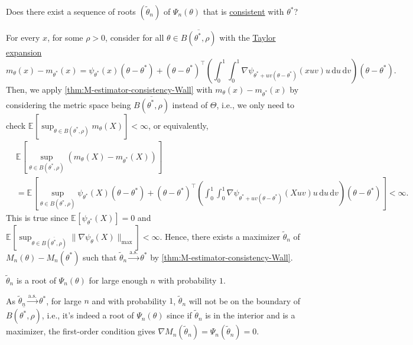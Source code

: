 \begin{problem*}
	Does there exist a sequence of roots \((\widetilde{\theta} _n)\) of \(\Psi _n(\theta )\) that is \hyperref[def:consistent]{consistent} with \(\theta ^{\ast} \)?
\end{problem*}
\begin{answer}
	For every \(x\), for some \(\rho > 0\), consider for all \(\theta \in \overline{B(\theta ^{\ast} , \rho )} \) with the \hyperref[note:lec10]{Taylor expansion}
	\[
		m_\theta (x) - m_{\theta ^{\ast} }(x)
		= \psi _{\theta ^{\ast} }(x) (\theta - \theta ^{\ast} ) + (\theta - \theta ^{\ast} )^{\top} \left( \int_{0}^{1} \int_{0}^{1} \nabla \psi _{\theta ^{\ast} + uv(\theta - \theta ^{\ast} )} (xuv) u \,\mathrm{d}u \,\mathrm{d}v \right) (\theta - \theta ^{\ast} ).
	\]
	Then, we apply \autoref{thm:M-estimator-consistency-Wall} with \(m_\theta (x) - m_{\theta ^{\ast} }(x)\) by considering the metric space being \(\overline{B(\theta ^{\ast} , \rho )} \) instead of \(\Theta \), i.e., we only need to check \(\mathbb{E}_{}[\sup _{\theta \in B(\theta ^{\ast} , \rho ) } m_\theta (X)] < \infty\), or equivalently,
	\[
		\begin{split}
			 & \mathbb{E}_{}\left[\sup _{\theta \in B(\theta ^{\ast} , \rho )} (m_\theta (X) - m_{\theta ^{\ast} }(X))\right]                                                                                                                                                                                                                            \\
			 & = \mathbb{E}_{}\left[\sup _{\theta \in B(\theta ^{\ast} , \rho )} \psi _{\theta ^{\ast} }(X) (\theta - \theta ^{\ast} ) + (\theta - \theta ^{\ast} )^{\top} \left( \int_{0}^{1} \int_{0}^{1} \nabla \psi _{\theta ^{\ast} + uv(\theta - \theta ^{\ast} )} (X uv) u \,\mathrm{d}u \,\mathrm{d}v \right) (\theta - \theta ^{\ast} ) \right]
			< \infty.
		\end{split}
	\]
	This is true since \(\mathbb{E}_{}[\psi _{\theta ^{\ast} } (X)] = 0\) and \(\mathbb{E}_{}[\sup _{\theta \in \overline{B(\theta ^{\ast} , \rho )} } \lVert \nabla \psi _\theta (X) \rVert _{\max }] < \infty \). Hence, there exists a maximizer \(\widetilde{\theta} _n\) of \(M_n(\theta ) - M_n(\theta ^{\ast} )\) such that \(\widetilde{\theta} _n \overset{\text{a.s.} }{\to} \theta ^{\ast} \) by \autoref{thm:M-estimator-consistency-Wall}.

	\begin{claim}
		\(\widetilde{\theta} _n\) is a root of \(\Psi _n(\theta )\) for large enough \(n\) with probability \(1\).
	\end{claim}
	\begin{explanation}
		As \(\widetilde{\theta} _n \overset{\text{a.s.} }{\to} \theta ^{\ast} \), for large \(n\) and with probability \(1\), \(\widetilde{\theta} _n\) will not be on the boundary of \(\overline{B(\theta ^{\ast} , \rho )} \), i.e., it's indeed a root of \(\Psi _n(\theta )\) since if \(\widetilde{\theta} _n\) is in the interior and is a maximizer, the first-order condition gives \(\nabla M_n(\widetilde{\theta} _n) = \Psi _n(\widetilde{\theta} _n) = 0\).
	\end{explanation}


\end{answer}
